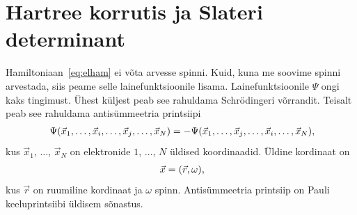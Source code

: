 \documentclass[12pt]{report}
\begin{document}
\section{Hartree korrutis ja Slateri determinant}\label{sec:hpsd}

Hamiltoniaan~\eqref{eq:elham} ei võta arvesse spinni.
Kuid, kuna me soovime spinni arvestada, siis peame selle lainefunktsioonile lisama.
Lainefunktsioonile \(\Psi\) ongi kaks tingimust.
Ühest küljest peab see rahuldama Schrödingeri võrrandit.
Teisalt peab see rahuldama antisümmeetria printsiipi
\begin{align}\label{eq:antisim}
    \Psi(\vec{x}_1, \ldots, \vec{x}_i, \ldots, \vec{x}_j, \ldots, \vec{x}_N) =
    -\Psi(\vec{x}_1, \ldots, \vec{x}_j, \ldots, \vec{x}_i, \ldots, \vec{x}_N) \rlap{,}
\end{align}
kus \(\vec{x}_1\), \(\ldots\), \(\vec{x}_N\) on elektronide \(1\), \(\ldots\), \(N\) üldised koordinaadid.
Üldine kordinaat on
\begin{align}
    \vec{x} = (\vec{r}, \omega) \rlap{,}
\end{align}
kus \(\vec{r}\) on ruumiline kordinaat ja \(\omega\) spinn.
Antisümmeetria printsiip on Pauli keeluprintsiibi üldisem sõnastus.
\end{document}
